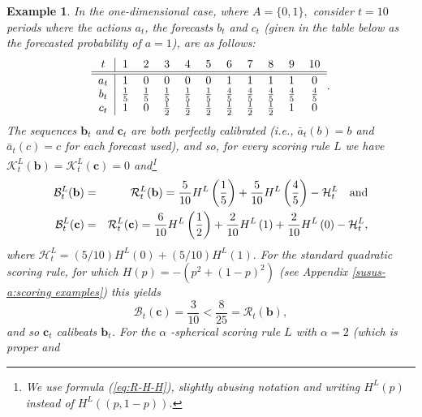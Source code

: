 \documentclass[12pt,a4paper,notitlepage]{article}
\newtheorem{example}[theorem]{Example}
\begin{document}
\begin{example}
\label{ex:not-S-beat}In the one-dimensional case, where $A=\{0,1\},$
consider $t=10$ periods where the actions $a_{t}$, the forecasts $b_{t}$ and 
$c_{t}$ (given in the table below as the forecasted probability of $a=1$),
are as follows:%
\begin{equation*}
\begin{tabular}{c|cccccccccc}
$t$ & $1$ & $2$ & $3$ & $4$ & $5$ & $6$ & $7$ & $8$ & $9$ & $10$ \\ 
\hline\hline
$a_{t}$ & $1$ & $0$ & $0$ & $0$ & $0$ & $1$ & $1$ & $1$ & $1$ & $0$ \\ 
$b_{t}$ & $\frac{1}{5}$ & $\frac{1}{5}$ & $\frac{1}{5}$ & $\frac{1}{5}$ & $%
\frac{1}{5}$ & $\frac{4}{5}$ & $\frac{4}{5}$ & $\frac{4}{5}$ & $\frac{4}{5}$
& $\frac{4}{5}$ \\ 
$c_{t}$ & $1$ & $0$ & $\frac{1}{2}$ & $\frac{1}{2}$ & $\frac{1}{2}$ & $\frac{%
1}{2}$ & $\frac{1}{2}$ & $\frac{1}{2}$ & $1$ & $0$%
\end{tabular}%
.
\end{equation*}%
The sequences $\mathbf{b}_{t}$ and $\mathbf{c}_{t}$ are both perfectly
calibrated (i.e., $\bar{a}_{t}(b)=b$ and $\bar{a}_{t}(c)=c$ for each
forecast used), and so, for every scoring rule $L$ we have $\mathcal{K}%
_{t}^{L}(\mathbf{b})=\mathcal{K}_{t}^{L}(\mathbf{c})=0$ and\footnote{%
We use formula (\ref{eq:R-H-H}), slightly abusing notation and writing $%
H^{L}(p)$ instead of $H^{L}((p,1-p))$.} 
\begin{eqnarray*}
\mathcal{B}_{t}^{L}(\mathbf{b}) &=&\mathcal{R}_{t}^{L}(\mathbf{b})=\frac{5}{%
10}H^{L}\left( \frac{1}{5}\right) +\frac{5}{10}H^{L}\left( \frac{4}{5}%
\right) -\mathcal{H}_{t}^{L}\text{\ \ \ and} \\
\mathcal{B}_{t}^{L}(\mathbf{c}) &=&\mathcal{R}_{t}^{L}(\mathbf{c})=\frac{6}{%
10}H^{L}\left( \frac{1}{2}\right) +\frac{2}{10}H^{L}\left( 1\right) +\frac{2%
}{10}H^{L}\left( 0\right) -\mathcal{H}_{t}^{L},
\end{eqnarray*}%
where $\mathcal{H}_{t}^{L}=(5/10)H^{L}(0)+(5/10)H^{L}(1).$ For the standard
quadratic scoring rule, for which $H(p)=-(p^{2}+(1-p)^{2})$ (see Appendix %
\ref{susus-a:scoring examples}) this yields%
\begin{equation}
\mathcal{B}_{t}(\mathbf{c})=\frac{3}{10}<\frac{8}{25}=\mathcal{R}_{t}(%
\mathbf{b}),  \label{eq:ex-quad}
\end{equation}%
and so $\mathbf{c}_{t}$ calibeats $\mathbf{b}_{t}$. For the $\alpha $%
-spherical scoring rule $L$ with $\alpha =2$ (which is proper and

\end{example}
\end{document}

